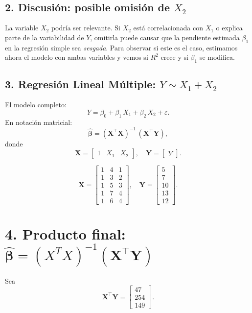 \documentclass[10pt,a4paper]{article}
\begin{document}
\begin{enumerate}
\subsection*{2. Discusi\'on: posible omisi\'on de $X_2$}
La variable $X_2$ podr\'ia ser relevante. Si $X_2$ est\'a correlacionada con $X_1$ o explica parte de la variabilidad de $Y$, omitirla puede causar que la pendiente estimada $\beta_1$ en la regresión simple sea \emph{sesgada}. Para observar si este es el caso, estimamos ahora el modelo con ambas variables y vemos si $R^2$ crece y si $\beta_1$ se modifica.

\subsection*{3. Regresi\'on Lineal M\'ultiple: $Y \sim X_1 + X_2$}

El modelo completo:
\[
Y = \beta_0 + \beta_1\,X_1 + \beta_2\,X_2 + \varepsilon.
\]
En notaci\'on matricial:
\[
\hat{\boldsymbol{\beta}}
= (\mathbf{X}^\top \mathbf{X})^{-1} \, (\mathbf{X}^\top \mathbf{Y}),
\]
donde
\[
\mathbf{X}
=
\begin{bmatrix}
1 & X_1 & X_2
\end{bmatrix},
\quad
\mathbf{Y}
=
\begin{bmatrix}
Y
\end{bmatrix}.
\]


\[
\mathbf{X}
=
\begin{bmatrix}
1 & 4 & 1\\
1 & 3 & 2\\
1 & 5 & 3\\
1 & 7 & 4\\
1 & 6 & 4
\end{bmatrix},
\quad
\mathbf{Y}
=
\begin{bmatrix}
5\\
7\\
10\\
13\\
12
\end{bmatrix}.
\]



\section*{4. Producto final: $\hat{\boldsymbol{\beta}} = (X^TX)^{-1}(\mathbf{X}^\top \mathbf{Y})$}

Sea
\[
\mathbf{X}^\top \mathbf{Y}
=
\begin{bmatrix}
47\\
254\\
149
\end{bmatrix}.
\]


\end{enumerate}
\end{document}
